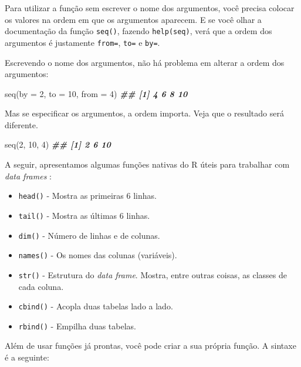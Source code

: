 \documentclass[
]{book}
\newenvironment{Shaded}{\begin{snugshade}}{\end{snugshade}}
\newcommand{\AttributeTok}[1]{\textcolor[rgb]{0.77,0.63,0.00}{#1}}
\newcommand{\DecValTok}[1]{\textcolor[rgb]{0.00,0.00,0.81}{#1}}
\newcommand{\DocumentationTok}[1]{\textcolor[rgb]{0.56,0.35,0.01}{\textbf{\textit{#1}}}}
\newcommand{\FunctionTok}[1]{\textcolor[rgb]{0.00,0.00,0.00}{#1}}
\newcommand{\NormalTok}[1]{#1}
\providecommand{\tightlist}{%
  \setlength{\itemsep}{0pt}\setlength{\parskip}{0pt}}
\begin{document}
Para utilizar a função sem escrever o nome dos argumentos, você precisa colocar os valores na ordem em que os argumentos aparecem. E se você olhar a documentação da função \texttt{seq()}, fazendo \texttt{help(seq)}, verá que a ordem dos argumentos é justamente \texttt{from=}, \texttt{to=} e \texttt{by=}.

Escrevendo o nome dos argumentos, não há problema em alterar a ordem dos argumentos:

\begin{Shaded}
\begin{Highlighting}[]
\FunctionTok{seq}\NormalTok{(}\AttributeTok{by =} \DecValTok{2}\NormalTok{, }\AttributeTok{to =} \DecValTok{10}\NormalTok{, }\AttributeTok{from =} \DecValTok{4}\NormalTok{)}
\DocumentationTok{\#\# [1]  4  6  8 10}
\end{Highlighting}
\end{Shaded}

Mas se especificar os argumentos, a ordem importa. Veja que o resultado será diferente.

\begin{Shaded}
\begin{Highlighting}[]
\FunctionTok{seq}\NormalTok{(}\DecValTok{2}\NormalTok{, }\DecValTok{10}\NormalTok{, }\DecValTok{4}\NormalTok{)}
\DocumentationTok{\#\# [1]  2  6 10}
\end{Highlighting}
\end{Shaded}

A seguir, apresentamos algumas funções nativas do R úteis para trabalhar com \emph{data frames} :

\begin{itemize}
\tightlist
\item
  \texttt{head()} - Mostra as primeiras 6 linhas.
\item
  \texttt{tail()} - Mostra as últimas 6 linhas.
\item
  \texttt{dim()} - Número de linhas e de colunas.
\item
  \texttt{names()} - Os nomes das colunas (variáveis).
\item
  \texttt{str()} - Estrutura do \emph{data frame}. Mostra, entre outras coisas, as classes de cada coluna.
\item
  \texttt{cbind()} - Acopla duas tabelas lado a lado.
\item
  \texttt{rbind()} - Empilha duas tabelas.
\end{itemize}

Além de usar funções já prontas, você pode criar a sua própria função. A sintaxe é a seguinte:
\end{document}
